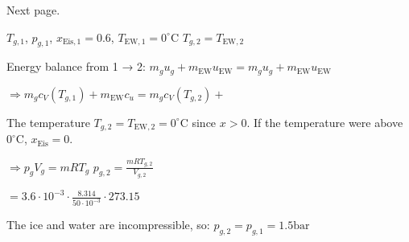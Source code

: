 Next page.

\( T_{g,1} \), \( p_{g,1} \), \( x_{\text{Eis},1} = 0.6 \), \( T_{\text{EW},1} = 0^\circ \text{C} \)  
\( T_{g,2} = T_{\text{EW},2} \)  

Energy balance from 1 → 2:  
\( m_g u_g + m_{\text{EW}} u_{\text{EW}} = m_g u_g + m_{\text{EW}} u_{\text{EW}} \)  

\( \Rightarrow m_g c_V (T_{g,1}) + m_{\text{EW}} c_u = m_g c_V (T_{g,2}) + \)  

The temperature \( T_{g,2} = T_{\text{EW},2} = 0^\circ \text{C} \) since \( x > 0 \).  
If the temperature were above \( 0^\circ \text{C} \), \( x_{\text{Eis}} = 0 \).  

\( \Rightarrow p_g V_g = m R T_g \)  
\( p_{g,2} = \frac{m R T_{g,2}}{V_{g,2}} \)  

\( = 3.6 \cdot 10^{-3} \cdot \frac{8.314}{50 \cdot 10^{-3}} \cdot 273.15 \)  

The ice and water are incompressible, so:  
\( p_{g,2} = p_{g,1} = 1.5 \text{bar} \)